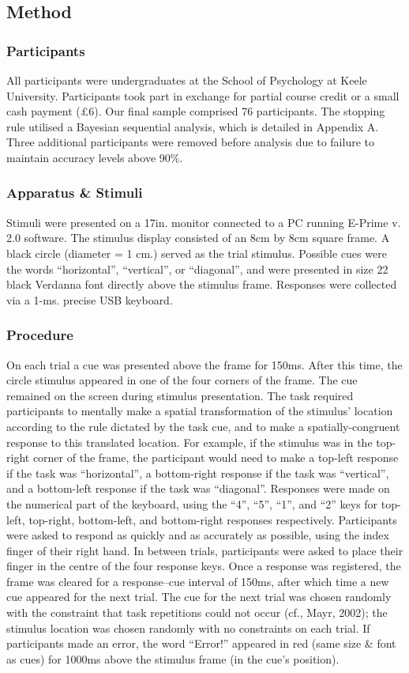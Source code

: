 \documentclass[a4paper, doc, natbib]{apa6}
\begin{document}
\subsection{Method}

\subsubsection{Participants}
All participants were undergraduates at the School of Psychology at Keele University. Participants took part in exchange for partial course credit or a small cash payment (£6). Our final sample comprised 76 participants. The stopping rule utilised a Bayesian sequential analysis, which is detailed in Appendix A. Three additional participants were removed before analysis due to failure to maintain accuracy levels above 90\%.

\subsubsection{Apparatus \& Stimuli}
Stimuli were presented on a 17in. monitor connected to a PC running E-Prime v. 2.0 software. The stimulus display consisted of an 8cm by 8cm square frame. A black circle (diameter = 1 cm.) served as the trial stimulus. Possible cues were the words ``horizontal'', ``vertical'', or ``diagonal'', and were presented in size 22 black Verdanna font directly above the stimulus frame. Responses were collected via a 1-ms. precise USB keyboard.

\subsubsection{Procedure}
On each trial a cue was presented above the frame for 150ms. After this time, the circle stimulus appeared in one of the four corners of the frame. The cue remained on the screen during stimulus presentation. The task required participants to mentally make a spatial transformation of the stimulus' location according to the rule dictated by the task cue, and to make a spatially-congruent response to this translated location. For example, if the stimulus was in the top-right corner of the frame, the participant would need to make a top-left response if the task was ``horizontal'', a bottom-right response if the task was ``vertical'', and a bottom-left response if the task was ``diagonal''. Responses were made on the numerical part of the keyboard, using the ``4'', ``5'', ``1'', and ``2'' keys for top-left, top-right, bottom-left, and bottom-right responses respectively. Participants were asked to respond as quickly and as accurately as possible, using the index finger of their right hand. In between trials, participants were asked to place their finger in the centre of the four response keys. Once a response was registered, the frame was cleared for a response--cue interval of 150ms, after which time a new cue appeared for the next trial. The cue for the next trial was chosen randomly with the constraint that task repetitions could not occur (cf., Mayr, 2002); the stimulus location was chosen randomly with no constraints on each trial. If participants made an error, the word ``Error!'' appeared in red (same size \& font as cues) for 1000ms above the stimulus frame (in the cue's position).
\end{document}
